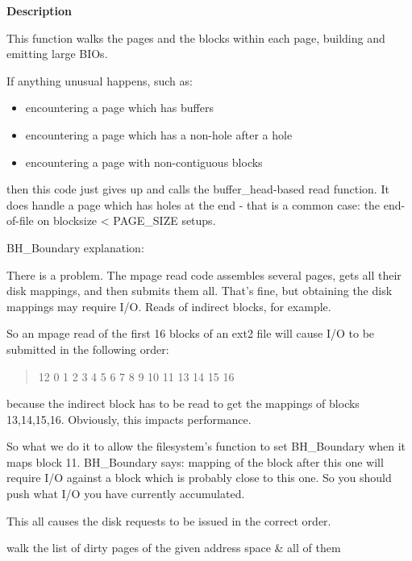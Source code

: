 \documentclass[a4paper,8pt,english]{sphinxmanual}
\begin{document}
\textbf{Description}

This function walks the pages and the blocks within each page, building and
emitting large BIOs.

If anything unusual happens, such as:
\begin{itemize}
\item {} 
encountering a page which has buffers

\item {} 
encountering a page which has a non-hole after a hole

\item {} 
encountering a page with non-contiguous blocks

\end{itemize}

then this code just gives up and calls the buffer\_head-based read function.
It does handle a page which has holes at the end - that is a common case:
the end-of-file on blocksize \textless{} PAGE\_SIZE setups.

BH\_Boundary explanation:

There is a problem.  The mpage read code assembles several pages, gets all
their disk mappings, and then submits them all.  That's fine, but obtaining
the disk mappings may require I/O.  Reads of indirect blocks, for example.

So an mpage read of the first 16 blocks of an ext2 file will cause I/O to be
submitted in the following order:
\begin{quote}

12 0 1 2 3 4 5 6 7 8 9 10 11 13 14 15 16
\end{quote}

because the indirect block has to be read to get the mappings of blocks
13,14,15,16.  Obviously, this impacts performance.

So what we do it to allow the filesystem's  function to set
BH\_Boundary when it maps block 11.  BH\_Boundary says: mapping of the block
after this one will require I/O against a block which is probably close to
this one.  So you should push what I/O you have currently accumulated.

This all causes the disk requests to be issued in the correct order.

\begin{fulllineitems}
\label{filesystems/index:c.mpage_writepages}
walk the list of dirty pages of the given address space \&  all of them

\end{fulllineitems}
\end{document}
